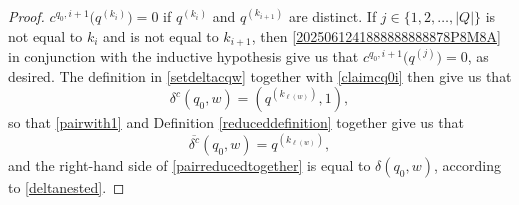 \documentclass[10pt,a4paper]{amsart}
\begin{document}
\begin{proof}
 $ c^{q_0, i+1}\big( q^{(k_{i})} \big) = 0 $ 
 if $q^{(k_i)}$ and $q^{(k_{i+1})}$ are distinct. 
 If $j \in \{ 1, 2, \ldots, |Q| \}$ is not equal to $k_i$ and is not equal to $k_{i+1}$, 
 then \eqref{2025061241888888888878P8M8A} in conjunction with the inductive hypothesis 
 give us that 
 $ c^{q_0, i+1}\big( q^{(j)} \big) = 0$, 
 as desired. The definition in \eqref{setdeltacqw} 
 together with \eqref{claimcq0i} then give us that 
\begin{equation}\label{pairwith1}
 \delta^{c}( q_0, w ) 
 = \left( q^{( k_{\ell(w)} )}, 
 1 \right), 
\end{equation}
 so that \eqref{pairwith1} and Definition \ref{reduceddefinition} together give us that 
\begin{equation}\label{pairreducedtogether}
 \overline{\delta^{c}}( q_0, w ) 
 = q^{( k_{\ell(w)} )}, 
\end{equation}
 and the right-hand side of \eqref{pairreducedtogether} is equal to 
 $\delta(q_0, w)$, according to \eqref{deltanested}. 
\end{proof}
\end{document}
